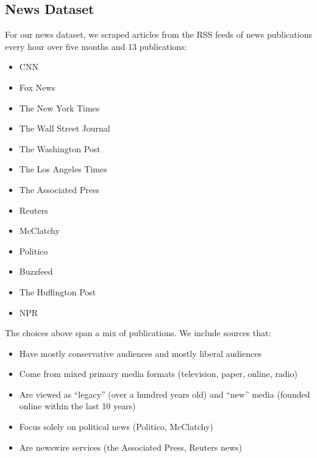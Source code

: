 \documentclass[letterpaper]{article}
\begin{document}
{%

\subsection{News Dataset}

 For our news dataset, we scraped articles from the RSS feeds of news publications every hour over five months and 13 publications:

\begin{multicols}{2}
\begin{itemize}

\item CNN
\item Fox News
\item The New York Times
\item The Wall Street Journal
\item The Washington Post
\item The Los Angeles Times 
\item The Associated Press
\item Reuters
\item McClatchy 
\item Politico 
\item Buzzfeed
\item The Huffington Post
\item NPR 
\end{itemize}
\end{multicols}

The choices above span a mix of publications. We include sources that: 

\begin{itemize}
\item Have mostly conservative audiences and mostly liberal audiences \cite{PoliticalPolarization}
\item Come from mixed primary media formats (television, paper, online, radio)
\item Are viewed as ``legacy'' (over a hundred years old) and ``new'' media (founded online within the last 10 years)
\item Focus solely on political news (Politico, McClatchy)
\item Are newswire services (the Associated Press, Reuters news)
\end{itemize}
 
}
\end{document}
